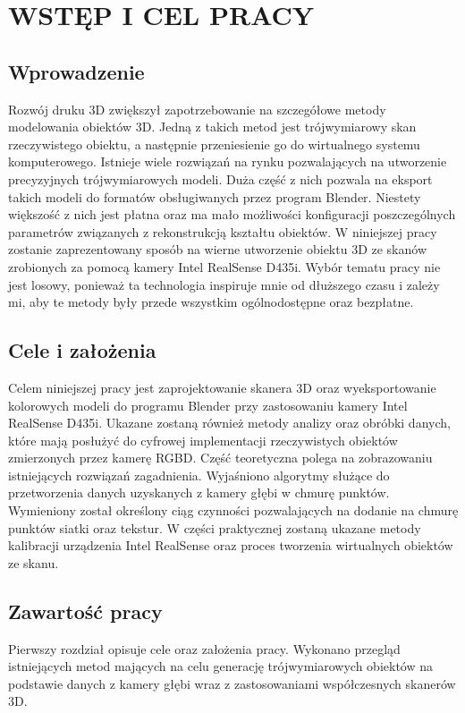 \documentclass[10pt,twoside]{article}
\begin{document}
\section{WSTĘP I CEL PRACY}
\subsection{Wprowadzenie}
Rozwój druku 3D zwiększył zapotrzebowanie na szczegółowe metody modelowania obiektów 3D. Jedną z takich metod jest trójwymiarowy skan rzeczywistego obiektu, a następnie przeniesienie go do wirtualnego systemu komputerowego. Istnieje wiele rozwiązań na rynku pozwalających na utworzenie precyzyjnych trójwymiarowych modeli. Duża część z nich pozwala na eksport takich modeli do formatów obsługiwanych przez program Blender. Niestety większość z nich jest płatna oraz ma mało możliwości konfiguracji poszczególnych parametrów związanych z rekonstrukcją kształtu obiektów. W niniejszej pracy zostanie zaprezentowany sposób na wierne utworzenie obiektu 3D ze skanów zrobionych za pomocą kamery Intel RealSense D435i. Wybór tematu pracy nie jest losowy, ponieważ ta technologia inspiruje mnie od dłuższego czasu i zależy mi, aby te metody były przede wszystkim ogólnodostępne oraz bezpłatne.
\subsection{Cele i założenia}
Celem niniejszej pracy jest zaprojektowanie skanera 3D oraz wyeksportowanie kolorowych modeli do programu Blender przy zastosowaniu kamery Intel RealSense D435i.
Ukazane zostaną również metody analizy oraz obróbki danych, które mają posłużyć do cyfrowej implementacji rzeczywistych obiektów zmierzonych przez kamerę RGBD. Część teoretyczna polega na zobrazowaniu istniejących rozwiązań zagadnienia. Wyjaśniono algorytmy służące do przetworzenia danych uzyskanych z kamery głębi w chmurę punktów. Wymieniony został określony ciąg czynności pozwalających na dodanie na chmurę punktów siatki oraz tekstur. W części praktycznej zostaną ukazane metody kalibracji urządzenia Intel RealSense oraz proces tworzenia wirtualnych obiektów ze skanu.
\subsection{Zawartość pracy}
Pierwszy rozdział opisuje cele oraz założenia pracy. Wykonano przegląd istniejących metod mających na celu generację trójwymiarowych obiektów na podstawie danych z kamery głębi wraz z zastosowaniami współczesnych skanerów 3D.
\end{document}
